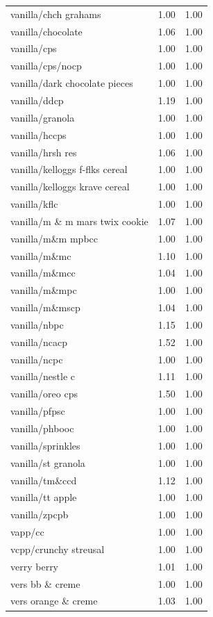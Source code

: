 \begin{table}
\begin{tabular}{lrr}
vanilla/chch grahams & 1.00 & 1.00 \\
vanilla/chocolate & 1.06 & 1.00 \\
vanilla/cps & 1.00 & 1.00 \\
vanilla/cps/nocp & 1.00 & 1.00 \\
vanilla/dark chocolate pieces & 1.00 & 1.00 \\
vanilla/ddcp & 1.19 & 1.00 \\
vanilla/granola & 1.00 & 1.00 \\
vanilla/hccps & 1.00 & 1.00 \\
vanilla/hrsh res & 1.06 & 1.00 \\
vanilla/kelloggs f-flks cereal & 1.00 & 1.00 \\
vanilla/kelloggs krave cereal & 1.00 & 1.00 \\
vanilla/kflc & 1.00 & 1.00 \\
vanilla/m \& m mars twix cookie & 1.07 & 1.00 \\
vanilla/m\&m mpbcc & 1.00 & 1.00 \\
vanilla/m\&mc & 1.10 & 1.00 \\
vanilla/m\&mcc & 1.04 & 1.00 \\
vanilla/m\&mpc & 1.00 & 1.00 \\
vanilla/m\&mscp & 1.04 & 1.00 \\
vanilla/nbpc & 1.15 & 1.00 \\
vanilla/ncacp & 1.52 & 1.00 \\
vanilla/ncpc & 1.00 & 1.00 \\
vanilla/nestle c & 1.11 & 1.00 \\
vanilla/oreo cps & 1.50 & 1.00 \\
vanilla/pfpsc & 1.00 & 1.00 \\
vanilla/phbooc & 1.00 & 1.00 \\
vanilla/sprinkles & 1.00 & 1.00 \\
vanilla/st granola & 1.00 & 1.00 \\
vanilla/tm\&ccd & 1.12 & 1.00 \\
vanilla/tt apple & 1.00 & 1.00 \\
vanilla/zpcpb & 1.00 & 1.00 \\
vapp/cc & 1.00 & 1.00 \\
vcpp/crunchy streusal & 1.00 & 1.00 \\
verry berry & 1.01 & 1.00 \\
vers bb \& creme & 1.00 & 1.00 \\
vers orange \& creme & 1.03 & 1.00 \\

\end{tabular}
\end{table}
